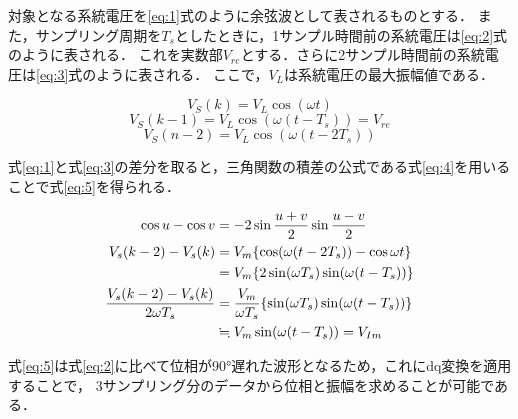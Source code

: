 対象となる系統電圧を\eqref{eq:1}式のように余弦波として表されるものとする．
また，サンプリング周期を$T_s$としたときに，1サンプル時間前の系統電圧は\eqref{eq:2}式のように表される．
これを実数部$V_{re}$とする．さらに2サンプル時間前の系統電圧は\eqref{eq:3}式のように表される．
ここで，$V_{L}$は系統電圧の最大振幅値である．

\begin{equation}
V_S(k) = V_L \cos(\omega t)\label{eq:1} 
\end{equation}
\begin{equation}
V_S(k-1) = V_L \cos(\omega(t-T_s) )=V_{re}\label{eq:2} 
\end{equation}
\begin{equation}
V_S(n-2) = V_L \cos(\omega(t-2T_s))\label{eq:3} 
\end{equation}

式\eqref{eq:1}と式\eqref{eq:3}の差分を取ると，三角関数の積差の公式である式\eqref{eq:4}を用いることで式\eqref{eq:5}を得られる．

\begin{align}
\cos u - \cos v &= -2 \sin \frac{u+v}{2} \sin \frac{u-v}{2} \label{eq:4}  \\
V_s(k-2) - V_s(k) &= V_m \{ \cos(\omega(t-2T_s)) - \cos \omega t \} \notag \\
&= V_m \{ 2 \sin(\omega T_s) \sin(\omega (t-T_s)) \} \notag \\
\frac{V_s(k-2) - V_s(k)}{2\omega T_s} &= \frac{V_m}{\omega T_s} \{ \sin(\omega T_s) \sin(\omega (t-T_s)) \} \notag \\
&\fallingdotseq V_m \sin(\omega (t-T_s)) = V_{Im} \label{eq:5} 
\end{align}

式\eqref{eq:5}は式\eqref{eq:2}に比べて位相が90°遅れた波形となるため，これにdq変換を適用することで，
3サンプリング分のデータから位相と振幅を求めることが可能である\cite{ref07}．

